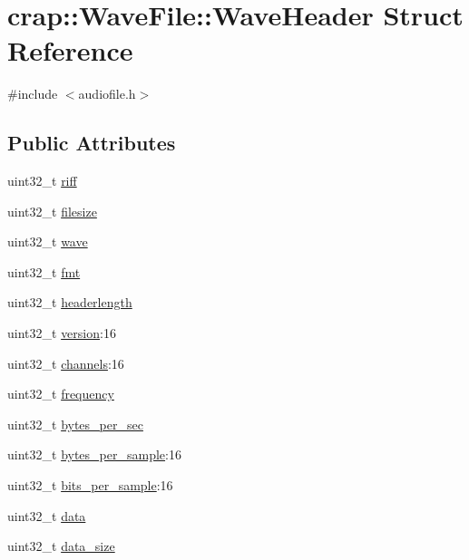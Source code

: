\hypertarget{structcrap_1_1_wave_file_1_1_wave_header}{\section{crap\+:\+:Wave\+File\+:\+:Wave\+Header Struct Reference}
\label{structcrap_1_1_wave_file_1_1_wave_header}
}


{\ttfamily \#include $<$audiofile.\+h$>$}

\subsection*{Public Attributes}
\begin{DoxyCompactItemize}
\item 
uint32\+\_\+t \hyperlink{structcrap_1_1_wave_file_1_1_wave_header_abf32e05680132afe847f29671bd0b039}{riff}
\item 
uint32\+\_\+t \hyperlink{structcrap_1_1_wave_file_1_1_wave_header_a66ee60f117774b2a2c89b3b5b5d7881f}{filesize}
\item 
uint32\+\_\+t \hyperlink{structcrap_1_1_wave_file_1_1_wave_header_a4d2d3de7ee47f37c098224695afc9ced}{wave}
\item 
uint32\+\_\+t \hyperlink{structcrap_1_1_wave_file_1_1_wave_header_a41722bd15601783d2587b233acb2e33b}{fmt}
\item 
uint32\+\_\+t \hyperlink{structcrap_1_1_wave_file_1_1_wave_header_a9b09473da66dc65a81f3af08246cc7b4}{headerlength}
\item 
uint32\+\_\+t \hyperlink{structcrap_1_1_wave_file_1_1_wave_header_ac2091625d4920909edeee79423f884b1}{version}\+:16
\item 
uint32\+\_\+t \hyperlink{structcrap_1_1_wave_file_1_1_wave_header_a8b7a99f75e7053e7de41704a531af9fb}{channels}\+:16
\item 
uint32\+\_\+t \hyperlink{structcrap_1_1_wave_file_1_1_wave_header_ad069c28d60b7f89e6d2be429ad4b0347}{frequency}
\item 
uint32\+\_\+t \hyperlink{structcrap_1_1_wave_file_1_1_wave_header_a3646f53398f2436d4ca44a9ba40fff46}{bytes\+\_\+per\+\_\+sec}
\item 
uint32\+\_\+t \hyperlink{structcrap_1_1_wave_file_1_1_wave_header_a107e3836f3150d03a2a9cb6d90d0bd4e}{bytes\+\_\+per\+\_\+sample}\+:16
\item 
uint32\+\_\+t \hyperlink{structcrap_1_1_wave_file_1_1_wave_header_a1d2dfb13f8420ff85379876e921377bc}{bits\+\_\+per\+\_\+sample}\+:16
\item 
uint32\+\_\+t \hyperlink{structcrap_1_1_wave_file_1_1_wave_header_af483dcde797314d2a0b7ec47de0ee90c}{data}
\item 
uint32\+\_\+t \hyperlink{structcrap_1_1_wave_file_1_1_wave_header_a10f71511e169d4e3c1f9ebffd89cf7a3}{data\+\_\+size}
\end{DoxyCompactItemize}


